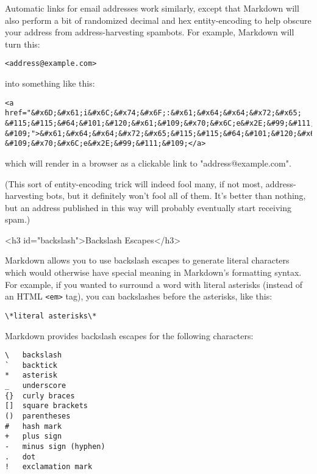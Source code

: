 Automatic links for email addresses work similarly, except that
Markdown will also perform a bit of randomized decimal and hex
entity-encoding to help obscure your address from address-harvesting
spambots. For example, Markdown will turn this:

\begin{lstlisting}
<address@example.com>
\end{lstlisting}




into something like this:

\begin{lstlisting}
<a href="&#x6D;&#x61;i&#x6C;&#x74;&#x6F;:&#x61;&#x64;&#x64;&#x72;&#x65;
&#115;&#115;&#64;&#101;&#120;&#x61;&#109;&#x70;&#x6C;e&#x2E;&#99;&#111;
&#109;">&#x61;&#x64;&#x64;&#x72;&#x65;&#115;&#115;&#64;&#101;&#120;&#x61;
&#109;&#x70;&#x6C;e&#x2E;&#99;&#111;&#109;</a>
\end{lstlisting}




which will render in a browser as a clickable link to "address@example.com".



(This sort of entity-encoding trick will indeed fool many, if not
most, address-harvesting bots, but it definitely won't fool all of
them. It's better than nothing, but an address published in this way
will probably eventually start receiving spam.)

<h3 id="backslash">Backslash Escapes</h3>



Markdown allows you to use backslash escapes to generate literal
characters which would otherwise have special meaning in Markdown's
formatting syntax. For example, if you wanted to surround a word with
literal asterisks (instead of an HTML \texttt{<em>} tag), you can backslashes
before the asterisks, like this:

\begin{lstlisting}
\*literal asterisks\*
\end{lstlisting}




Markdown provides backslash escapes for the following characters:

\begin{lstlisting}
\   backslash
`   backtick
*   asterisk
_   underscore
{}  curly braces
[]  square brackets
()  parentheses
#   hash mark
+   plus sign
-   minus sign (hyphen)
.   dot
!   exclamation mark
\end{lstlisting}

